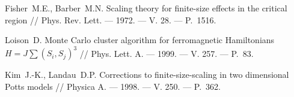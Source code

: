 \begin{thebibliography}{11}
Fisher~M.E., Barber~M.N. 
Scaling theory for finite-size effects in the critical region 
// 
Phys. Rev. Lett. 
--- 1972. 
--- V. 28. 
--- P.~1516.





Loison~D. 
Monte Carlo cluster algorithm for ferromagnetic Hamiltonians $H = J\sum(S_i, S_j)^3$ 
// 
Phys. Lett. A. 
--- 1999. 
--- V. 257. 
--- P.~83.





Kim~J.-K., Landau~D.P. 
Corrections to finite-size-scaling in two dimensional Potts models 
// 
Physica A. 
--- 1998. 
--- V. 250. 
--- P.~362.


\end{thebibliography} 